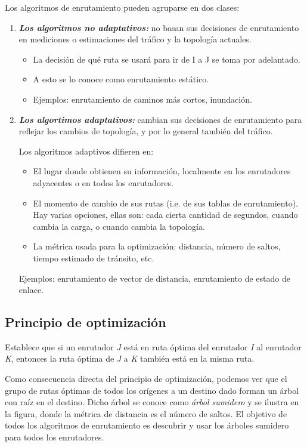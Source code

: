\documentclass[10pt,a4paper]{report}
\begin{document}
		\par Los algoritmos de enrutamiento pueden agruparse en dos clases: 
		\begin{enumerate}
		
			\item  \textbf{\emph{Los algoritmos no adaptativos: }} no basan sus 
			decisiones de enrutamiento en mediciones o estimaciones del tráfico y la 
			topología actuales.
			\begin{itemize}
				\item La decisión de qué ruta se usará para ir de I a J se toma por 
				adelantado.
				\item A esto se lo conoce como enrutamiento estático.
				\item Ejemplos: enrutamiento de caminos más cortos, inundación.
			\end{itemize}
			
			\item \textbf{\emph{Los algortimos adaptativos:}} cambian sus decisiones de 
			enrutamiento para reflejar los cambios de topología, y por lo general también 
			del tráfico.
			\par Los algoritmos adaptivos difieren en:
			\begin{itemize}
				\item El lugar donde obtienen su información, localmente en los enrutadores 
				adyacentes o en todos los enrutadores.
				\item El momento de cambio de sus rutas (i.e. de sus tablas de 
				enrutamiento). Hay varias opciones, ellas son: cada cierta cantidad de 
				segundos, cuando cambia la carga, o cuando cambia la topología.
				\item La métrica usada para la optimización: distancia, número de saltos, 
				tiempo estimado de tránsito, etc.
			\end{itemize}
			\par Ejemplos: enrutamiento de vector de distancia, enrutamiento de estado de 
			enlace.		
		\end{enumerate}

\subsection{Principio de optimización}
	\par Establece que si un enrutador \textit{J} está en ruta óptima 
	del enrutador \textit{I} al enrutador \textit{K}, entonces la ruta óptima de \textit{J}
	a \textit{K} también está en la misma ruta.
	\par Como consecuencia directa del principio de optimización, podemos ver que el 
	grupo de rutas óptimas de todos los orígenes a un destino dado forman un árbol con 
	raíz en el destino. Dicho árbol se conoce como \textit{árbol sumidero} y se ilustra en 
	la figura, donde la métrica de distancia es el número de saltos. El objetivo de todos 
	los algoritmos de enrutamiento es descubrir y usar los árboles sumidero para todos 
	los enrutadores.
	
\end{document}
